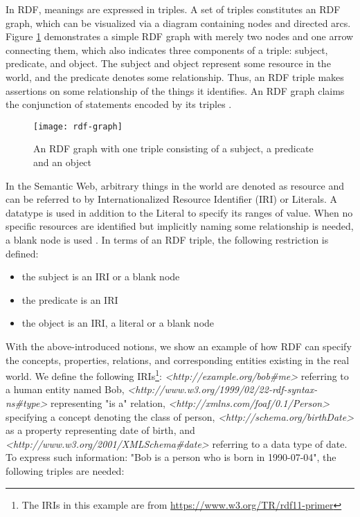 In RDF, meanings are expressed in triples. A set of triples constitutes an RDF graph, which can be visualized via a diagram containing nodes and directed arcs. Figure \ref{figure:rdf example} demonstrates a simple RDF graph with merely two nodes and one arrow connecting them, which also indicates three components of a triple: subject, predicate, and object. The subject and object represent some resource in the world, and the predicate denotes some relationship. Thus, an RDF triple makes assertions on some relationship of the things it identifies. An RDF graph claims the conjunction of statements encoded by its triples \cite{Cyganiak2014}.

\begin{figure}[h]
\texttt{[image: rdf-graph]}
\centering
\caption{An RDF graph with one triple consisting of a subject, a predicate and an object}
\label{figure:rdf example}
\end{figure}

In the Semantic Web, arbitrary things in the world are denoted as resource and can be referred to by Internationalized Resource Identifier (IRI) or Literals. A datatype is used in addition to the Literal to specify its ranges of value. When no specific resources are identified but implicitly naming some relationship is needed, a blank node is used \cite{Cyganiak2014}. In terms of an RDF triple, the following restriction is defined: 
\medskip
\begin{itemize}
\item the subject is an IRI or a blank node
\item the predicate is an IRI
\item the object is an IRI, a literal or a blank node
\end{itemize}

With the above-introduced notions, we show an example of how RDF can specify the concepts, properties, relations, and corresponding entities existing in the real world. We define the following IRIs\footnote{The IRIs in this example are from \url{https://www.w3.org/TR/rdf11-primer}}: \textit{<http://example.org/bob\#me>} referring to a human entity named Bob, \textit{<http://www.w3.org/1999/02/22-rdf-syntax-ns\#type>} representing "is a" relation, \textit{<http://xmlns.com/foaf/0.1/Person>} specifying a concept denoting the class of person, \textit{<http://schema.org/birthDate>} as a property representing date of birth, and \textit{<http://www.w3.org/2001/XMLSchema\#date>} referring to a data type of date. To express such information: "Bob is a person who is born in 1990-07-04", the following triples are needed:

